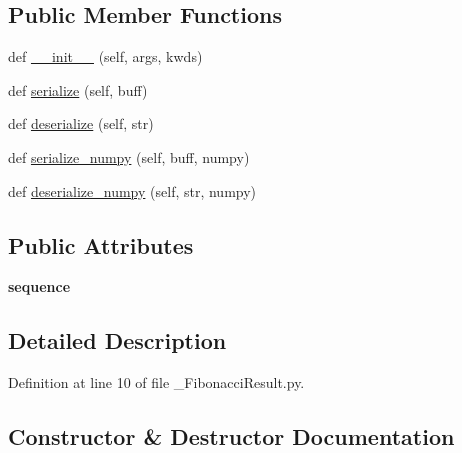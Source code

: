 \subsection*{Public Member Functions}
\begin{DoxyCompactItemize}
\item 
def \hyperlink{classlearning__actionlib_1_1msg_1_1__FibonacciResult_1_1FibonacciResult_a3742709030edae4464082d55e3f84af7}{\+\_\+\+\_\+init\+\_\+\+\_\+} (self, args, kwds)
\item 
def \hyperlink{classlearning__actionlib_1_1msg_1_1__FibonacciResult_1_1FibonacciResult_a8647768033e36bdaf161eec828e6aeb0}{serialize} (self, buff)
\item 
def \hyperlink{classlearning__actionlib_1_1msg_1_1__FibonacciResult_1_1FibonacciResult_af50c6126354ca3ea603bc8c31aa5c9ed}{deserialize} (self, str)
\item 
def \hyperlink{classlearning__actionlib_1_1msg_1_1__FibonacciResult_1_1FibonacciResult_a539b8e24f3bd43c917b31a6cf665bc03}{serialize\+\_\+numpy} (self, buff, numpy)
\item 
def \hyperlink{classlearning__actionlib_1_1msg_1_1__FibonacciResult_1_1FibonacciResult_a48f975222777be2dd3761045e06cccc4}{deserialize\+\_\+numpy} (self, str, numpy)
\end{DoxyCompactItemize}
\subsection*{Public Attributes}
\begin{DoxyCompactItemize}
\item 
\mbox{\label{classlearning__actionlib_1_1msg_1_1__FibonacciResult_1_1FibonacciResult_a000814bbd9a547280555773489743023}} 
{\bfseries sequence}
\end{DoxyCompactItemize}


\subsection{Detailed Description}


Definition at line 10 of file \+\_\+\+Fibonacci\+Result.\+py.



\subsection{Constructor \& Destructor Documentation}
\mbox{\label{classlearning__actionlib_1_1msg_1_1__FibonacciResult_1_1FibonacciResult_a3742709030edae4464082d55e3f84af7}} 
